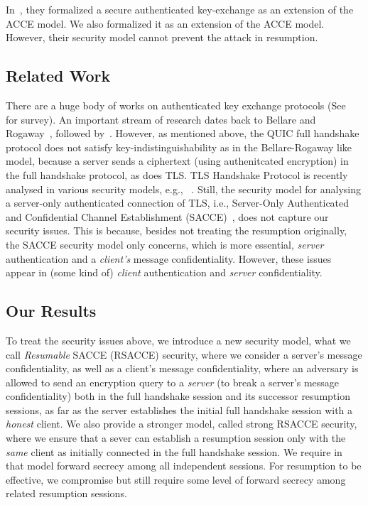 In~\cite{LJBN15:QUIC}, they formalized a secure authenticated key-exchange as an extension of the ACCE model. We also formalized it as an extension of the ACCE model. However, their security model cannot prevent the attack in resumption.

\subsection{Related Work} \label{sec:Related Work}
There are a huge body of works on authenticated key exchange protocols
(See~\cite{CK01:AKE} for survey).
An important stream of research dates back to Bellare and Rogaway~\cite{BR93:AKE}, followed by~\cite{DB96,Blei98,JMDP00,JB02,EK09,KK05:TLS,KCRE08,SMOAJ08,KTT11,Kraw01}.
However, as mentioned above,
the QUIC full handshake protocol does not satisfy key-indistinguishability as in the Bellare-Rogaway like model, because a server sends a ciphertext (using authenitcated encryption) in the full handshake protocol, as does TLS.
TLS Handshake Protocol is recently analysed in various security models, e.g., ~\cite{JKSS12:ACCE,KPW13:SACCE,FS13:ACCE,GKS13:RACCE,BDKSS14:SSH,BFKPSB14:TLS}.
Still,
the security model for analysing a server-only authenticated connection of TLS,
i.e., Server-Only Authenticated and Confidential Channel Establishment
(SACCE)~\cite{KPW13:SACCE}, does not capture our security issues.
This is because, besides not treating the resumption originally,
the SACCE security model only concerns, which is more essential,
\textit{server} authentication and a \textit{client's} message confidentiality.
However, these issues appear in (some kind of) \textit{client} authentication
and \textit{server} confidentiality.

\subsection{Our Results} \label{sec:proposal}

To treat the security issues above,
we introduce a new security model, what we call \textit{Resumable} SACCE (RSACCE) security,
where we consider a server's message confidentiality, as well as a client's message confidentiality,
where an adversary is allowed to send an encryption query to a \textit{server}
(to break a server's message confidentiality)
both in the full handshake session and its successor resumption sessions,
as far as the server establishes the initial full handshake session
with a \textit{honest} client.
We also provide a stronger model, called strong RSACCE security,
where we ensure that a sever can establish a resumption session only with the \textit{same} client as
initially connected in the full handshake session.
We require in that model forward secrecy among all independent sessions.
For resumption to be effective, we compromise but still require
some level of forward secrecy among related resumption sessions.

